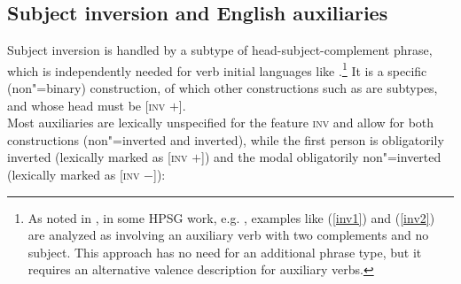 \eal
\settowidth{}
 \label{inv1}
\label{inv2}
\zl

\subsection{Subject inversion and English auxiliaries}

Subject inversion is handled by a subtype of head-subject-complement phrase, which is independently
needed for verb initial languages like  \parencites[]{Borsley99c-u}[]{SWB2003a}.\footnote{As
  noted in \crossrefchapterw[\page \pageref{page-properties:aux-inversion}]{properties}, in some HPSG work, e.g. ,
  examples like (\ref{inv1}) and (\ref{inv2}) are analyzed as involving an auxiliary verb with two
  complements and no subject. This approach has no need for an additional phrase type, but it
  requires an alternative valence description for auxiliary verbs.} It is a specific (non"=binary)
construction, of which other constructions such as  are subtypes,
and whose head must be [\textsc{inv} $+$].
\ea
{} \impl\\
\z
Most auxiliaries are lexically unspecified for the feature \textsc{inv} and allow for both constructions
(non"=inverted and inverted), while the first person  is obligatorily inverted (lexically
marked as [\textsc{inv} $+$]) and the modal  obligatorily non"=inverted (lexically marked
as [\textsc{inv} $-$]):

